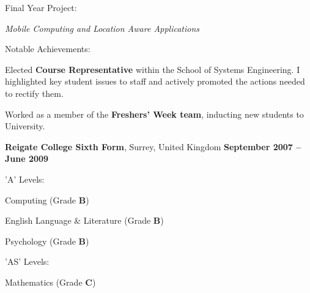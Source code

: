 \documentclass[margin,line,a4paper]{resume}
\begin{document}
\begin{resume}
    	\begin{list2}
	\item Final Year Project:
	\vspace{1mm}%
		\begin{list3}
			\item \textsl{Mobile Computing and Location Aware Applications}\
		\end{list3}
	\vspace{1mm}%

	\item Notable Achievements:
	\vspace{1mm}%
		\begin{list3}
			\item Elected \textbf{Course Representative} within the School of Systems Engineering. I highlighted key student issues to staff and actively promoted the actions needed to rectify them.
			\item Worked as a member of the \textbf{Freshers' Week team}, inducting new students to University.
		\end{list3}
    	\end{list2}

	\vspace{-1mm}%

	\addtolength{\linewidth}{7mm}

    	\textbf{Reigate College Sixth Form}, Surrey, United Kingdom		\hfill		\textbf{ September 2007 -- June 2009} 			
	\vspace{2mm}\\
	\vspace{-8mm}%
		\begin{multicols}{2}
			\begin{list2}
        			\item 'A' Levels:
					\begin{list3}
						\item Computing (Grade \textbf{B})
						\item English Language \& Literature (Grade \textbf{B})
						\columnbreak
						\item Psychology (Grade \textbf{B})
					\end{list3}
				\item 'AS' Levels:
					\begin{list3}
						\item Mathematics (Grade \textbf{C})
					\end{list3}
			\end{list2}
		\end{multicols}
	\vspace{-5mm}%


\end{resume}
\end{document}
